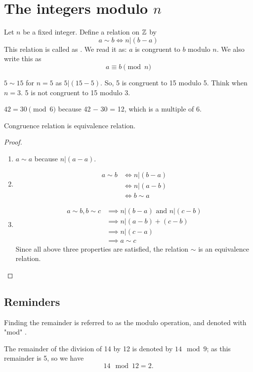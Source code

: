 \section{The integers modulo $n$}
Let $n$ be a fixed integer. Define a relation on $\mathbb Z$ by
\[a \sim b \iff n|(b-a)\]
This relation is called as .
We read it as: $a$ is congruent to $b$ modulo $n$. We also write this as
\[a\equiv b \pmod{n} \]
\begin{ex}
	$5\sim 15$ for $n=5$ as $5|(15-5)$. So, 5 is congruent to 15 modulo 5. Think when $n=3$. 5 is not congruent to 15 modulo 3.
\end{ex}
\begin{ex}  
$42 = 30 \pmod{6}$
because 42 − 30 = 12, which is a multiple of 6.
\end{ex}
\begin{thm}
	Congruence relation is equivalence relation.
\end{thm}
\begin{proof}
\begin{enumerate}
	\item $a\sim a$ because $n|(a-a)$.
	\item 
	\begin{align*}
	a\sim b 	&\iff n|(b-a) \\
				&\iff n|(a-b) \\
				&\iff b\sim a 
	\end{align*}
	
		\item 
	\begin{align*}
	a\sim b, b \sim c 	&\implies n|(b-a) \text{ and }  n | (c-b) \\
	&\implies n|(a-b)+(c-b) \\
	&\implies n|(c-a) \\
	&\implies a\sim c 
	\end{align*}
Since all above three properties are satisfied, the relation $\sim$ is an equivalence relation.
\end{enumerate}	
\end{proof}
\subsection{Reminders}
Finding the remainder is referred to as the modulo operation, and denoted with "mod" . 
\begin{ex}
The remainder of the division of 14 by 12 is denoted by $14 \mod 9$; as this remainder is 5, so we have 
$$14 \mod 12 = 2.$$
\end{ex}

